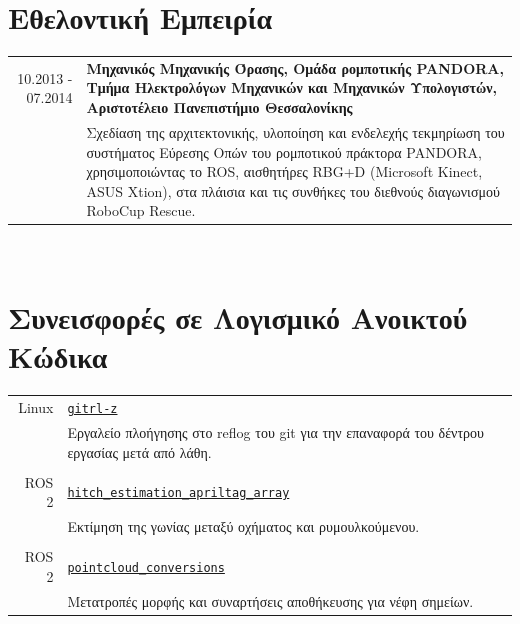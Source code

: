 \documentclass[a4paper,10pt,twoside]{article}
\begin{document}
\section{Εθελοντική Εμπειρία}

\begin{tabular}{rp{12cm}}
10.2013 - 07.2014 & \textbf{Μηχανικός Μηχανικής Όρασης, Ομάδα ρομποτικής PANDORA,
                    Τμήμα Ηλεκτρολόγων Μηχανικών και Μηχανικών Υπολογιστών, Αριστοτέλειο Πανεπιστήμιο Θεσσαλονίκης} \\
                  & Σχεδίαση της αρχιτεκτονικής, υλοποίηση και ενδελεχής τεκμηρίωση
                    του συστήματος Εύρεσης Οπών του ρομποτικού πράκτορα PANDORA, χρησιμοποιώντας το ROS, αισθητήρες RBG+D
                    (Microsoft Kinect, ASUS Xtion), στα πλάισια και τις συνθήκες του διεθνούς διαγωνισμού RoboCup Rescue.\\
\end{tabular} \\


\section{Συνεισφορές σε Λογισμικό Ανοικτού Κώδικα}

\begin{tabular}{rp{12cm}}
Linux & \href{https://github.com/li9i/gitrl-z}{\texttt{gitrl-z}} \\
      & Εργαλείο πλοήγησης στο reflog του git για την επαναφορά του δέντρου εργασίας μετά από λάθη. \\
&\\
ROS 2 & \href{https://index.ros.org/p/hitch_estimation_apriltag_array/#humble}{\texttt{hitch\_estimation\_apriltag\_array}} \\
      & Εκτίμηση της γωνίας μεταξύ οχήματος και ρυμουλκούμενου. \\
&\\
ROS 2 & \href{https://index.ros.org/r/pointcloud_conversions/#lyrical}{\texttt{pointcloud\_conversions}} \\
      & Μετατροπές μορφής και συναρτήσεις αποθήκευσης για νέφη σημείων. \\
\end{tabular} \\
\vspace*{\fill}
\newpage
\end{document}
